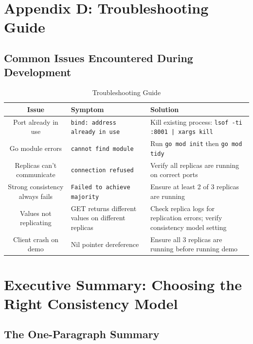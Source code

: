 \documentclass[10pt,a4paper]{article}
\begin{document}
\section{Appendix D: Troubleshooting Guide}

\subsection{Common Issues Encountered During Development}

\begin{table}[H]
\centering
\caption{Troubleshooting Guide}
\begin{tabular}{|c|p{5cm}|p{5cm}|}
\hline
\textbf{Issue} & \textbf{Symptom} & \textbf{Solution} \\
\hline
Port already in use & \texttt{bind: address already in use} & Kill existing process: \texttt{lsof -ti :8001 | xargs kill} \\
\hline
Go module errors & \texttt{cannot find module} & Run \texttt{go mod init} then \texttt{go mod tidy} \\
\hline
Replicas can't communicate & \texttt{connection refused} & Verify all replicas are running on correct ports \\
\hline
Strong consistency always fails & \texttt{Failed to achieve majority} & Ensure at least 2 of 3 replicas are running \\
\hline
Values not replicating & GET returns different values on different replicas & Check replica logs for replication errors; verify consistency model setting \\
\hline
Client crash on demo & Nil pointer dereference & Ensure all 3 replicas are running before running demo \\
\hline
\end{tabular}
\end{table}
\section{Executive Summary: Choosing the Right Consistency Model}

\subsection{The One-Paragraph Summary}
\end{document}

